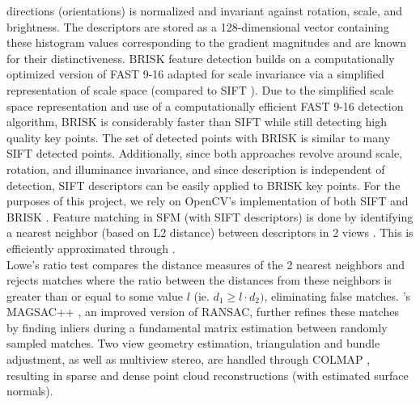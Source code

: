 \documentclass[conference,compsoc]{IEEEtran}
\begin{document}
directions (orientations) is normalized and invariant against rotation, 
scale, and brightness. The descriptors are stored as a 128-dimensional 
vector containing these histogram values corresponding to the gradient 
magnitudes and are known for their distinctiveness. BRISK feature detection
\cite{brisk} builds on a computationally optimized version of 
FAST 9-16 adapted for scale invariance via a simplified representation of 
scale space (compared to SIFT \cite{sift}). Due to the simplified scale 
space representation and use of a computationally efficient FAST 9-16 
detection algorithm, BRISK is considerably faster than SIFT while still 
detecting high quality key points. The set of detected points with BRISK is 
similar to many SIFT detected points. Additionally, since both approaches 
revolve around scale, rotation, and illuminance invariance, and since description 
is independent of detection, SIFT descriptors can be easily applied to BRISK key 
points. For the purposes of this project, we rely on OpenCV's 
implementation of both SIFT \cite{siftcv} and BRISK \cite{briskcv}.
Feature matching in SFM (with SIFT descriptors) is done by identifying 
a nearest neighbor (based on L2 distance) between descriptors in 2 views \cite{sift}.
This is efficiently approximated through \cite{fnn}.\\
Lowe's ratio test \cite{sift} compares the distance measures of 
the 2 nearest neighbors and rejects matches where the ratio between the 
distances from these neighbors is greater than or equal to some value $l$ (ie.
$d_1 \ge l \cdot d_2)$, eliminating false matches. \cite{usac}'s 
MAGSAC++ \cite{magsac}, an improved version of RANSAC, further 
refines these matches by finding inliers during a fundamental 
matrix estimation between randomly sampled matches. 
Two view geometry estimation, triangulation and bundle adjustment, 
as well as multiview stereo, are handled through COLMAP \cite{colmap}
\cite{schoenberger2016sfm} \cite{schoenberger2016mvs}, resulting in sparse 
and dense point cloud reconstructions (with estimated surface normals).
\end{document}
